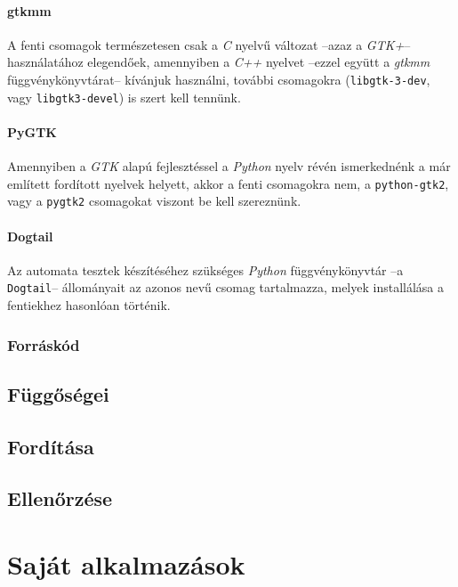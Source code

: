 \paragraph{gtkmm}

A fenti csomagok természetesen csak a \textit{C} nyelvű változat --azaz a \textit{GTK+}-- használatához elegendőek, amennyiben a \textit{C++} nyelvet --ezzel együtt a \textit{gtkmm} függvénykönyvtárat-- kívánjuk használni, további csomagokra (\texttt{libgtk-3-dev}, vagy \texttt{libgtk3-devel}) is szert kell tennünk.

\paragraph{PyGTK}

Amennyiben a \textit{GTK} alapú fejlesztéssel a \textit{Python} nyelv révén ismerkednénk a már említett fordított nyelvek helyett, akkor a fenti csomagokra nem, a \texttt{python-gtk2}, vagy a \texttt{pygtk2} csomagokat viszont be kell szereznünk.

\paragraph{Dogtail}

Az automata tesztek készítéséhez szükséges \textit{Python} függvénykönyvtár --a \texttt{Dogtail}-- állományait az azonos nevű csomag tartalmazza, melyek installálása a fentiekhez hasonlóan történik.

\subsubsection{Forráskód}



\subsection{Függőségei}

\subsection{Fordítása}

\subsection{Ellenőrzése}

\section{Saját alkalmazások}

